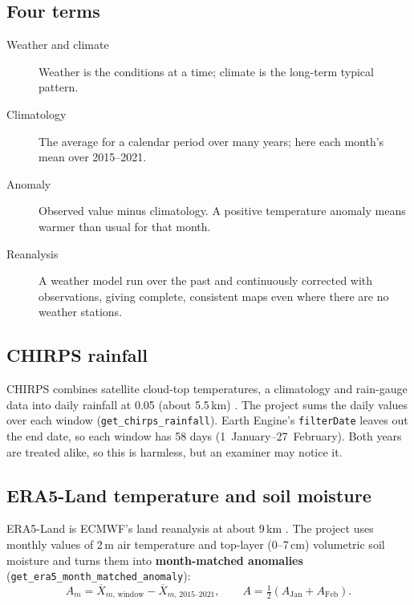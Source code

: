 \subsection{Four terms}

\begin{description}
  \item[Weather and climate] Weather is the conditions at a time; climate is the long-term typical pattern.
  \item[Climatology] The average for a calendar period over many years; here each month's mean over 2015--2021.
  \item[Anomaly] Observed value minus climatology. A positive temperature anomaly means warmer than usual for that month.
  \item[Reanalysis] A weather model run over the past and continuously corrected with observations, giving complete, consistent maps even where there are no weather stations.
\end{description}

\subsection{CHIRPS rainfall}

CHIRPS combines satellite cloud-top temperatures, a climatology and rain-gauge data into daily rainfall at 0.05\dg{} (about 5.5\,km) \citep{funk2015}. The project sums the daily values over each window (\texttt{get\_chirps\_rainfall}). Earth Engine's \texttt{filterDate} leaves out the end date, so each window has 58 days (1~January--27~February). Both years are treated alike, so this is harmless, but an examiner may notice it.

\subsection{ERA5-Land temperature and soil moisture}

ERA5-Land is ECMWF's land reanalysis at about 9\,km \citep{munozsabater2021}. The project uses monthly values of 2\,m air temperature and top-layer (0--7\,cm) volumetric soil moisture and turns them into \textbf{month-matched anomalies} (\texttt{get\_era5\_month\_matched\_anomaly}):
\begin{equation}
A_m = \overline{X}_{m,\,\text{window}} - \overline{X}_{m,\,2015\text{--}2021},
\qquad
A = \tfrac{1}{2}\left(A_{\text{Jan}} + A_{\text{Feb}}\right).
\label{eq:anomaly}
\end{equation}

